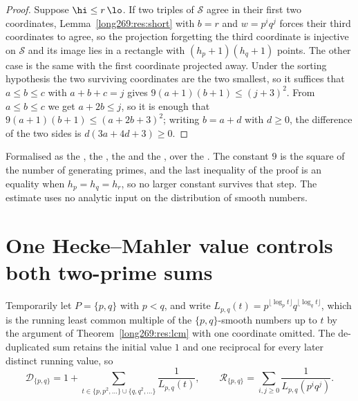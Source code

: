 \begin{proof}
Suppose $\hi\le r\,\lo$.  If two triples of $\mathcal S$ agree in their first
two coordinates, Lemma~\ref{long269:res:short} with $b=r$ and $w=p^{i}q^{j}$ forces
their third coordinates to agree, so the projection forgetting the third
coordinate is injective on $\mathcal S$ and its image lies in a rectangle with
$(h_p+1)(h_q+1)$ points.  The other case is the same with the first coordinate
projected away.  Under the sorting hypothesis the two surviving coordinates are
the two smallest, so it suffices that $a\le b\le c$ with $a+b+c=j$ gives
$9(a+1)(b+1)\le(j+3)^{2}$.  From $a\le b\le c$ we get $a+2b\le j$, so it is
enough that $9(a+1)(b+1)\le(a+2b+3)^{2}$; writing $b=a+d$ with $d\ge0$, the
difference of the two sides is $d(3a+4d+3)\ge0$.
\end{proof}

\noindent Formalised as the
, the
, the
 and the
, over the
.  The constant $9$ is the square of the number of generating
primes, and the last inequality of the proof is an equality when
$h_p=h_q=h_r$, so no larger constant survives that step.  The estimate uses no
analytic input on the distribution of smooth numbers.

\section{One Hecke--Mahler value controls both two-prime sums}
\label{long269:sec:two-prime}

Temporarily let $P=\{p,q\}$ with $p<q$, and write
$L_{p,q}(t)=p^{\lfloor\log_p t\rfloor}q^{\lfloor\log_q t\rfloor}$, which is the
running least common multiple of the $\{p,q\}$-smooth numbers up to $t$ by the
argument of Theorem~\ref{long269:res:lcm} with one coordinate omitted.  The
de-duplicated sum retains the initial value $1$ and one reciprocal for every
later distinct running value, so
\[
 \mathcal D_{\{p,q\}}
 =1+\sum_{t\in\{p,p^2,\ldots\}\cup\{q,q^2,\ldots\}}\frac1{L_{p,q}(t)},
 \qquad
 \mathcal R_{\{p,q\}}=\sum_{i,j\ge0}\frac1{L_{p,q}(p^iq^j)} .
\]

